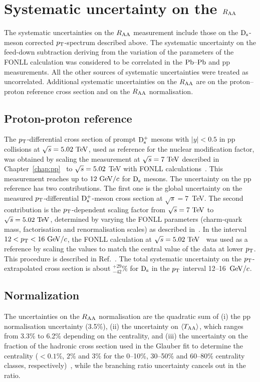 \section{Systematic uncertainty on the $R_{\rm AA}$}
\label{sec:SystRAA}
The systematic uncertainties on the $R_{\rm AA}$ measurement include those 
on the ${\rm D_s}$-meson corrected $p_{\rm T}$-spectrum described above. The systematic 
uncertainty on the feed-down subtraction deriving from
the variation of the parameters of the FONLL calculation was considered to be
correlated in the $\mbox{Pb--Pb}$ and pp measurements. All the 
other sources of systematic uncertainties were treated as uncorrelated. 
Additional systematic uncertainties on the $R_{\rm AA}$ are on 
the proton--proton reference cross section and on the $R_{\rm AA}$ normalisation. 

\subsection{Proton-proton reference}
\label{sec:PPrefSyst}
The $p_{\rm T}$-differential cross section of prompt ${\rm D_s^+}$ mesons with 
$|y|<0.5$ in pp collisions at $\sqrt s=5.02~\mathrm{TeV}$, used as reference 
for the nuclear modification factor, was obtained by scaling the 
measurement at $\sqrt{s}=7~\mathrm{TeV}$ described in 
Chapter~\ref{chap:pp}~\cite{Acharya:2017jgo} to $\sqrt{s} = 5.02$ TeV 
with FONLL calculations~\cite{Cacciari:2012ny}. This measurement 
reaches up to $12~\mathrm{GeV}/c$ for ${\rm D_s}$ mesons.
The uncertainty on the pp reference 
has two contributions. The first one is the global uncertainty on the measured 
$p_{\rm T}$-differential ${\rm D_s^+}$-meson cross section at $\sqrt s=7$~TeV.
The second contribution is the $p_{\rm T}$-dependent scaling factor 
from $\sqrt{s}=7~\mathrm{TeV}$ to $\sqrt{s}=5.02~\mathrm{TeV}$, determined by varying
the FONLL parameters (charm-quark mass, factorisation and renormalisation scales) 
as described in~\cite{Averbeck:2011ga}. 
In the interval $12<p_{\rm T}<16~\mathrm{GeV}/c$, the FONLL calculation at 
$\sqrt s=5.02~\mathrm{TeV}$~\cite{Cacciari:2012ny} was used as a reference 
by scaling the values to match the central value of the data at lower $p_{\rm T}$. 
This procedure is described in Ref.~\cite{Adam:2015sza}. The total 
systematic uncertainty on the $p_{\rm T}$-extrapolated cross section is about 
$^{+29}_{-42}\%$ for ${\rm D_s}$ in the $p_{\rm T}$ interval 12--16~$\mathrm{GeV}/c$.


\subsection{Normalization}
\label{sec:NormalizSyst}
The uncertainties on the $R_{\rm AA}$ normalisation are the quadratic sum of 
(i) the pp normalisation uncertainty (3.5\%), 
(ii) the uncertainty on $\langle T_{\rm AA} \rangle$, which ranges from 3.3\% to 6.2\% depending on the centrality, and
(iii) the uncertainty on the fraction of the hadronic cross section used in the 
Glauber fit to determine the centrality ($<0.1\%$, $2\%$ and $3\%$ for the 0--10\%, 30--50\% 
and 60--80\% centrality classes, respectively)~\cite{Adam:2015sza}, while the branching ratio uncertainty cancels out in the 
ratio.

